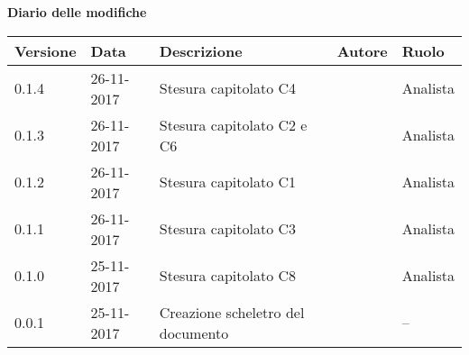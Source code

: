 \documentclass[main.tex]{subfiles}
\begin{document}
\huge \bfseries Diario delle modifiche\\
\begin{table}[htbp]
	\centering
	\renewcommand\arraystretch{1.2}

	\begin{tabularx}{\textwidth}{p{2cm}|p{2cm}|p{4cm}|p{2cm}|p{3cm}}
		\hline
		\textbf{Versione} & \textbf{Data} & \textbf{Descrizione} & \textbf{Autore} & \textbf{Ruolo}\\

		\hline
		0.1.4 & 26-11-2017 & Stesura capitolato C4 & \Valentina & Analista\\
		
		\hline
		0.1.3 & 26-11-2017 & Stesura capitolato C2 e C6 & \Mirco & Analista \\

		\hline
		0.1.2 & 26-11-2017 & Stesura capitolato C1 & \Riccardo & Analista \\
		
		\hline
		0.1.1 & 26-11-2017 & Stesura capitolato C3 & \Davide & Analista \\
		
		\hline
		0.1.0 & 25-11-2017 & Stesura capitolato C8 & \Elena & Analista \\
		
		\hline
		0.0.1 & 25-11-2017 & Creazione scheletro del documento & \Valentina & -- \\
		\hline
	
	\end{tabularx}

\end{table}
\end{document}
